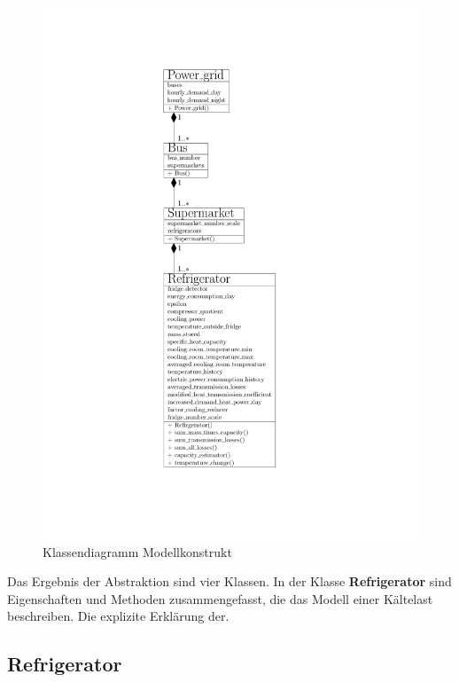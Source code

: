 \begin{figure}[h!]
\caption{Klassendiagramm Modellkonstrukt}
	\label{fig:klassendiagramm}
	\begin{center}
	\includegraphics[scale=0.7]{images/Theorie_Super/class_new_diagramm}
	\end{center}
\end{figure}

Das Ergebnis der Abstraktion sind vier Klassen. In der Klasse
\textbf{Refrigerator} sind Eigenschaften und Methoden zusammengefasst, die das
Modell einer K\"altelast beschreiben. Die explizite Erkl\"arung der.

\subsection*{Refrigerator}

